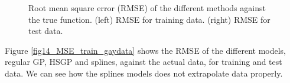 \documentclass[]{interact}
\theoremstyle{plain}%
\theoremstyle{definition}
\theoremstyle{remark}
\begin{document}
\begin{figure}
\caption{Root mean square error (RMSE) of the different methods against the true function. (left) RMSE for training data. (right) RMSE for test data.}
  \label{fig13_MSE_train_BF_gaydata}
\end{figure}

Figure \ref{fig14_MSE_train_gaydata} shows the RMSE of the different models, regular GP, HSGP and splines, against the actual data, for training and test data. We can see how the splines models does not extrapolate data properly.
\end{document}
